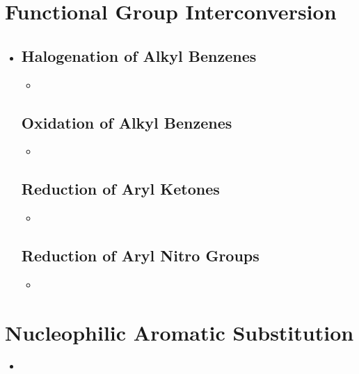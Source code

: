 \section{Functional Group Interconversion}\label{Functional Group Interconversion}
\begin{itemize}
  \item [] 
  
  \subsection{Halogenation of Alkyl Benzenes}\label{Halogenation of Alkyl Benzenes}
  \begin{itemize}
    \item 
  \end{itemize}

  \subsection{Oxidation of Alkyl Benzenes}\label{Oxidation of Alkyl Benzenes}
  \begin{itemize}
      \item 
  \end{itemize}
  
  \subsection{Reduction of Aryl Ketones}\label{Reduction of Aryl Ketones}
  \begin{itemize}
      \item 
  \end{itemize}

  \subsection{Reduction of Aryl Nitro Groups}\label{Reduction of Aryl Nitro Groups}
  \begin{itemize}
      \item 
  \end{itemize}
\end{itemize}

\section{Nucleophilic Aromatic Substitution}\label{Nucleophilic Aromatic Substitution}
\begin{itemize}
    \item 
\end{itemize}
